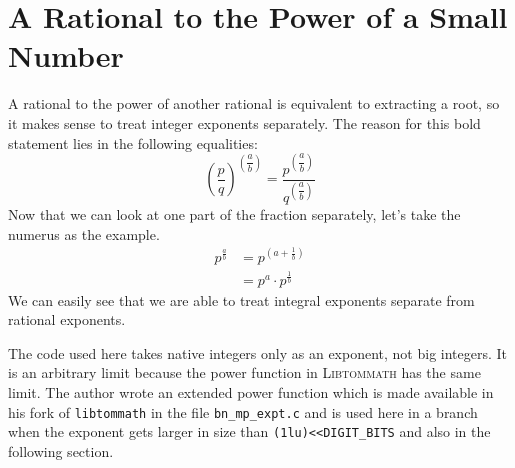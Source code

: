 \documentclass[10pt]{book}
\newcommand{\aname}[1]{{\scshape{#1}}}
\newcommand{\code}[1]{{\texttt{#1}}}
\theoremstyle{definition}
\theoremstyle{remark}
\begin{document}
\section{A Rational to the Power of a Small Number}
A rational to the power of another rational is equivalent to extracting a root,
so it makes sense to treat integer exponents separately. The reason for this
bold statement lies in the following equalities:
\begin{equation}
{ \left( \frac{p}{q} \right) }^{ \left( {\dfrac{a}{b}} \right)} 
    = \frac{ p^{\left({\dfrac{a}{b}}\right)} }
           { q^{\left({\dfrac{a}{b}}\right)} }
\end{equation}
Now that we can look at one part of the fraction separately, let's take the
numerus as the example.
\begin{align}
   p^\frac{a}{b} &= p^{\left(a + \frac{1}{b}\right)}\\
                 &= p^a \cdot p^\frac{1}{b}
\end{align}
We can easily see that we are able to treat integral exponents separate from
rational exponents.

The code used here takes native integers only as an exponent, not big integers.
It is an arbitrary limit because the power function in \aname{Libtommath}
has the same limit. The author wrote an extended power function which is made
available in his fork of \code{libtommath} in the file \code{bn\_mp\_expt.c} and
is used here in a branch when the exponent gets larger in size than
\lstinline!(1lu)<<DIGIT_BITS! and also in the following section.
\end{document}
